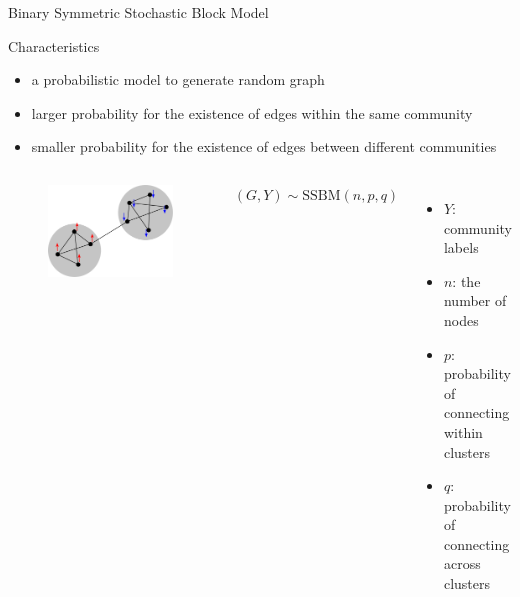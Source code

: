 \documentclass{beamer}
\begin{document}
\begin{frame}{Binary Symmetric Stochastic Block Model}
	\begin{block}{Characteristics}
		\begin{itemize}
		\item a probabilistic model to generate random graph
		\item larger probability for the existence of edges within the same community
		\item smaller probability for the existence of edges between different communities
		\end{itemize}
		\end{block}
		\begin{columns}
				\begin{figure}
				\includegraphics[width=\textwidth]{sbm.png}
			\end{figure}
		\quad$(G,Y)\sim \textrm{SSBM}(n, p, q)$
		\begin{itemize}
			\item $Y$: community labels
			\item $n$: the number of nodes
			\item $p$: probability of connecting within clusters
			\item $q$: probability of connecting across clusters
		\end{itemize}
		\end{columns}	
\end{frame}
\end{document}
